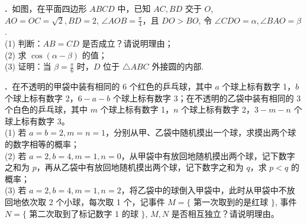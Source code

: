 \documentclass[11pt,a4paper]{ctexart}
\begin{document}
\begin{freeblock}
  \noindent\textbf{.\ }如图，在平面四边形 $ABCD$ 中，已知 $AC, BD$ 交于 $O$, $AO = OC = \sqrt{2}, BD=2$, $\angle AOB = \frac{\pi}{4}$，且 $DO > BO$, 令 $\angle CDO = \alpha, \angle BAO = \beta$.\\
  (1) 判断：$AB=CD$ 是否成立？请说明理由；\\
  (2) 求 $\cos(\alpha - \beta)$ 的值；\\
  (3) 证明：当 $\beta = \frac{\pi}{6}$ 时，$D$ 位于 $\triangle ABC$ 外接圆的内部.
  \begin{center}
  \end{center}
\end{freeblock}

\begin{freeblock}
  \noindent\textbf{.\ }在不透明的甲袋中装有相同的 6 个红色的乒乓球，其中 $a$ 个球上标有数字 1，$b$ 个球上标有数字 2，$6-a-b$ 个球上标有数字 3；在不透明的乙袋中装有相同的 3 个白色的乒乓球，其中 $m$ 个球上标有数字 1，$n$ 个球上标有数字 2，$3-m-n$ 个球上标有数字 3。\\
  (1) 若 $a=b=2, m=n=1$，分别从甲、乙袋中随机摸出一个球，求摸出两个球的数字相等的概率；\\
  (2) 若 $a=2, b=4, m=1, n=0$，从甲袋中有放回地随机摸出两个球，记下数字之和为 $p$，再从乙袋中有放回地随机摸出两个球，记下数字之和为 $q$，求 $p < q$ 的概率；\\
  (3) 若 $a=2, b=4, m=1, n=2$，将乙袋中的球倒入甲袋中，此时从甲袋中不放回地依次取 2 个小球，每次取 1 个，记事件 $M = \{$ 第一次取到的是红球 $\}$, 事件 $N = \{$ 第二次取到了标记数字 1 的球 $\}$, $M, N$ 是否相互独立？请说明理由。
\end{freeblock}
\end{document}
